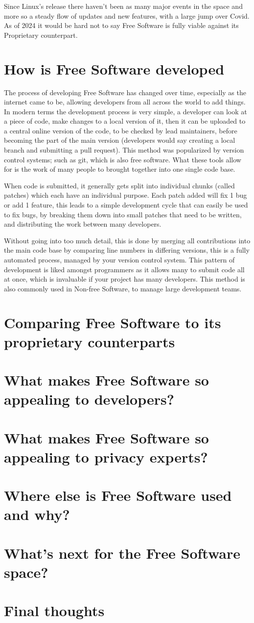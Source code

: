 \documentclass[a4paper,12pt]{article}
\begin{document}
{Since Linux's release there haven't been as many major events in the space and more so a steady flow
of updates and new features, with a large jump over Covid. As of 2024 it would be hard not to 
say Free Software is fully viable against its Proprietary counterpart.

\section{How is Free Software developed}
The process of developing Free Software has changed over time, especially as the internet came to be,
allowing developers from all across the world to add things. In modern terms the development process is 
very simple, a developer can look at a piece of code, make changes to a local version of it, then it 
can be uploaded to a central online version of the code, to be checked by lead maintainers, before becoming
the part of the main version (developers would say creating a local branch and submitting a pull request). 
This method was popularized by version control systems; such as git\cite{GIT}, which is also free software. 
What these tools allow for is the work of many people to brought together into one single code base.

When code is submitted, it generally gets split into individual chunks (called patches) which each
have an individual purpose. Each patch added will fix 1 bug or add 1 feature, this leads to a simple
development cycle that can easily be used to fix bugs, by breaking them down into small patches that
need to be written, and distributing the work between many developers. 

Without going into too much detail, this is done by merging all contributions into the main code base
by comparing line numbers in differing versions, this is a fully automated process, managed by your
version control system. This pattern of development is liked amongst programmers as it allows many 
to submit code all at once, which is invaluable if your project has many developers. This method
is also commonly used in Non-free Software, to manage large development teams\cite{NONFREEvcs}.

\section{Comparing Free Software to its proprietary counterparts}
\section{What makes Free Software so appealing to developers?}
\section{What makes Free Software so appealing to privacy experts?}
\section{Where else is Free Software used and why?}
\section{What's next for the Free Software space?}
\section{Final thoughts}

\newpage
\printbibliography
}
\end{document}
